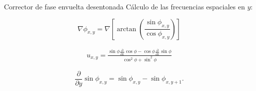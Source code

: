 \documentclass[]{beamer}
\begin{document}
\begin{frame}{Corrector de fase envuelta desentonada}
C\'alculo de las frecuencias espaciales en $y$:
\begin{center}

\begin{equation*}
  \nabla \phi_{x,y} = \nabla \left[ \arctan \left(\frac{\sin{\phi_{x,y}}}	
      {\cos{\phi_{x,y}}}\right)\right]
\end{equation*}

\begin{eqnarray*}
  u_{x,y} = \frac{\sin \phi \frac{\partial}{\partial x}  \cos \phi - \cos 
  \phi \frac{\partial}{\partial x} \sin \phi}{ \cos^2 \phi + \sin^2 \phi }
\end{eqnarray*}

\begin{equation*}
  \frac{\partial}{\partial y} \sin\phi_{x,y} = 
  \sin\phi_{x,y}-\sin\phi_{x,y+1}.
\end{equation*}

\end{center}
\end{frame}
\end{document}
